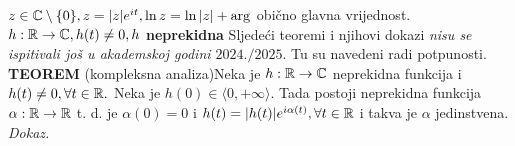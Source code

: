 \documentclass{article}
\begin{document}
\(z\in\Bbb C\setminus\{0\},z=|z|e^{it},\ln z=\ln|z|+\arg\) obično glavna vrijednost.\newline \(h:\Bbb R\to\Bbb C,h(t)\ne0,h\) \textbf{neprekidna}\newline\newline
Sljedeći teoremi i njihovi dokazi \emph{nisu se ispitivali još u akademskoj godini \(2024./2025.\)} Tu su navedeni radi potpunosti.\newline\newline
\textbf{TEOREM} (kompleksna analiza)\newline Neka je \(h:\Bbb R\to\Bbb C\) neprekidna funkcija i \(h(t)\ne0,\forall t\in\Bbb R.\) Neka je \(h(0)\in\langle 0,+\infty\rangle.\) Tada postoji neprekidna funkcija \(\alpha:\Bbb R\to\Bbb R\) t. d. je \(\alpha(0)=0\) i \(h(t)=|h(t)|e^{i\alpha(t)},\forall t\in\Bbb R\) i takva je \(\alpha\) jedinstvena.\newline\newline
\textit{Dokaz.}\newline
\end{document}
